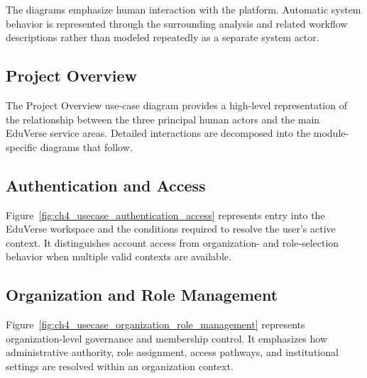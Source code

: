 The diagrams emphasize human interaction with the platform. Automatic system
behavior is represented through the surrounding analysis and related workflow
descriptions rather than modeled repeatedly as a separate system actor.

\begingroup
\makeatletter
\renewenvironment{figure}[1][]{%
  \par\addvspace{\intextsep}%
  \noindent\begin{minipage}{\textwidth}%
    \def\@captype{figure}%
}{%
  \end{minipage}%
  \par\addvspace{\intextsep}%
}
\renewenvironment{samepage}{%
\par\addvspace{0.75\baselineskip}%

  \noindent\begin{minipage}{\textwidth}%
}{%
  \end{minipage}\par\addvspace{0.65\baselineskip}%
}
\makeatother

\begin{samepage}

\subsection*{Project Overview}

The Project Overview use-case diagram provides a high-level representation of
the relationship between the three principal human actors and the main
EduVerse service areas. Detailed interactions are decomposed into the
module-specific diagrams that follow.
\end{samepage}

\begin{samepage}
\subsection*{Authentication and Access}

Figure~\ref{fig:ch4_usecase_authentication_access} represents entry into the
EduVerse workspace and the conditions required to resolve the user's active
context. It distinguishes account access from organization- and role-selection
behavior when multiple valid contexts are available.
\end{samepage}

\begin{samepage}
\subsection*{Organization and Role Management}

Figure~\ref{fig:ch4_usecase_organization_role_management} represents
organization-level governance and membership control. It emphasizes how
administrative authority, role assignment, access pathways, and institutional
settings are resolved within an organization context.
\end{samepage}

